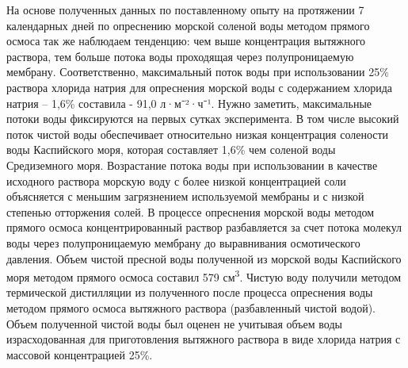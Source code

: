
На основе полученных данных по поставленному опыту на протяжении 7
календарных дней по опреснению морской соленой воды методом прямого
осмоса так же наблюдаем тенденцию: чем выше концентрация вытяжного
раствора, тем больше потока воды проходящая через полупроницаемую
мембрану. Соответственно, максимальный поток воды при использовании 25\%
раствора хлорида натрия для опреснения морской воды с содержанием
хлорида натрия -- 1,6\% составила - 91,0 л·м⁻²·ч⁻¹. Нужно заметить,
максимальные потоки воды фиксируются на первых сутках эксперимента. В
том числе высокий поток чистой воды обеспечивает относительно низкая
концентрация солености воды Каспийского моря, которая составляет 1,6\%
чем соленой воды Средиземного моря. Возрастание потока воды при
использовании в качестве исходного раствора морскую воду с более низкой
концентрацией соли объясняется с меньшим загрязнением используемой
мембраны и с низкой степенью отторжения солей. В процессе опреснения
морской воды методом прямого осмоса концентрированный раствор
разбавляется за счет потока молекул воды через полупроницаемую мембрану
до выравнивания осмотического давления. Объем чистой пресной воды
полученной из морской воды Каспийского моря методом прямого осмоса
составил 579 см\textsuperscript{3}. Чистую воду получили методом
термической дистилляции из полученного после процесса опреснения воды
методом прямого осмоса вытяжного раствора (разбавленный чистой водой).
Объем полученной чистой воды был оценен не учитывая объем воды
израсходованная для приготовления вытяжного раствора в виде хлорида
натрия с массовой концентрацией 25\%.

